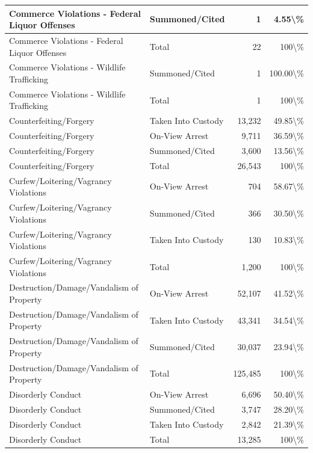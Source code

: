 \documentclass[
]{krantz}
\begin{document}
\begin{longtable}[t]{l|l|r|r}
\hline
Commerce Violations - Federal Liquor Offenses & Summoned/Cited & 1 & 4.55\textbackslash{}\%\\
\hline
Commerce Violations - Federal Liquor Offenses & Total & 22 & 100\textbackslash{}\%\\
\hline
Commerce Violations - Wildlife Trafficking & Summoned/Cited & 1 & 100.00\textbackslash{}\%\\
\hline
Commerce Violations - Wildlife Trafficking & Total & 1 & 100\textbackslash{}\%\\
\hline
Counterfeiting/Forgery & Taken Into Custody & 13,232 & 49.85\textbackslash{}\%\\
\hline
Counterfeiting/Forgery & On-View Arrest & 9,711 & 36.59\textbackslash{}\%\\
\hline
Counterfeiting/Forgery & Summoned/Cited & 3,600 & 13.56\textbackslash{}\%\\
\hline
Counterfeiting/Forgery & Total & 26,543 & 100\textbackslash{}\%\\
\hline
Curfew/Loitering/Vagrancy Violations & On-View Arrest & 704 & 58.67\textbackslash{}\%\\
\hline
Curfew/Loitering/Vagrancy Violations & Summoned/Cited & 366 & 30.50\textbackslash{}\%\\
\hline
Curfew/Loitering/Vagrancy Violations & Taken Into Custody & 130 & 10.83\textbackslash{}\%\\
\hline
Curfew/Loitering/Vagrancy Violations & Total & 1,200 & 100\textbackslash{}\%\\
\hline
Destruction/Damage/Vandalism of Property & On-View Arrest & 52,107 & 41.52\textbackslash{}\%\\
\hline
Destruction/Damage/Vandalism of Property & Taken Into Custody & 43,341 & 34.54\textbackslash{}\%\\
\hline
Destruction/Damage/Vandalism of Property & Summoned/Cited & 30,037 & 23.94\textbackslash{}\%\\
\hline
Destruction/Damage/Vandalism of Property & Total & 125,485 & 100\textbackslash{}\%\\
\hline
Disorderly Conduct & On-View Arrest & 6,696 & 50.40\textbackslash{}\%\\
\hline
Disorderly Conduct & Summoned/Cited & 3,747 & 28.20\textbackslash{}\%\\
\hline
Disorderly Conduct & Taken Into Custody & 2,842 & 21.39\textbackslash{}\%\\
\hline
Disorderly Conduct & Total & 13,285 & 100\textbackslash{}\%\\
\hline

\end{longtable}
\end{document}
